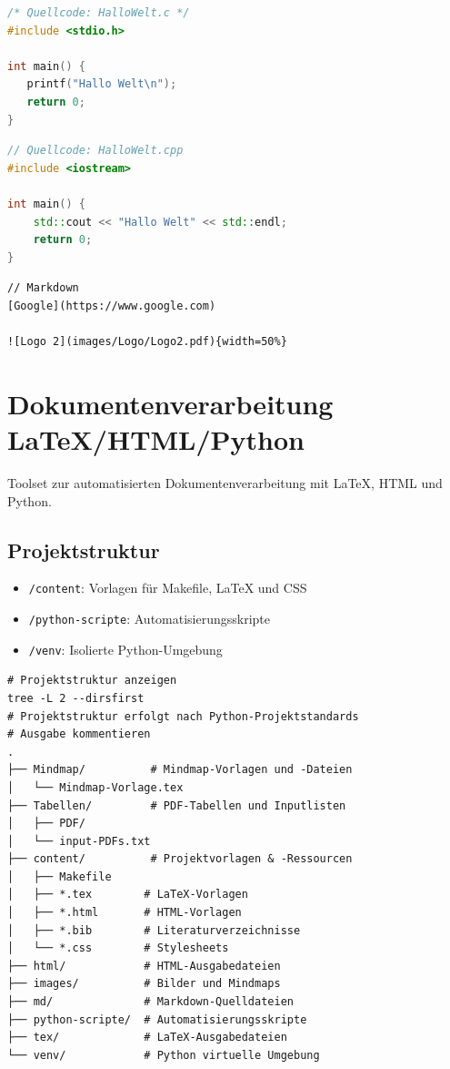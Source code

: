 \documentclass{vorlage-design-main}
\begin{document}
\begin{lstlisting}[language=C]
/* Quellcode: HalloWelt.c */
#include <stdio.h>

int main() {
   printf("Hallo Welt\n");
   return 0;
}
\end{lstlisting}

\begin{lstlisting}[language={C++}]
// Quellcode: HalloWelt.cpp
#include <iostream>

int main() {
    std::cout << "Hallo Welt" << std::endl;
    return 0;
}
\end{lstlisting}

\begin{lstlisting}
// Markdown
[Google](https://www.google.com)

![Logo 2](images/Logo/Logo2.pdf){width=50%}
\end{lstlisting}

\section{Dokumentenverarbeitung
LaTeX/HTML/Python}\label{dokumentenverarbeitung-latexhtmlpython}

Toolset zur automatisierten Dokumentenverarbeitung mit LaTeX, HTML und
Python.

\subsection{Projektstruktur}\label{projektstruktur}

\begin{itemize}

\item
  \verb|/content|: Vorlagen für Makefile, LaTeX und
  CSS
\item
  \verb|/python-scripte|: Automatisierungsskripte
\item
  \verb|/venv|: Isolierte Python-Umgebung
\end{itemize}

\begin{lstlisting}
# Projektstruktur anzeigen
tree -L 2 --dirsfirst
# Projektstruktur erfolgt nach Python-Projektstandards
# Ausgabe kommentieren
.
├── Mindmap/          # Mindmap-Vorlagen und -Dateien
│   └── Mindmap-Vorlage.tex
├── Tabellen/         # PDF-Tabellen und Inputlisten
│   ├── PDF/
│   └── input-PDFs.txt
├── content/          # Projektvorlagen & -Ressourcen
│   ├── Makefile
│   ├── *.tex        # LaTeX-Vorlagen
│   ├── *.html       # HTML-Vorlagen
│   ├── *.bib        # Literaturverzeichnisse
│   └── *.css        # Stylesheets
├── html/            # HTML-Ausgabedateien
├── images/          # Bilder und Mindmaps
├── md/              # Markdown-Quelldateien
├── python-scripte/  # Automatisierungsskripte
├── tex/             # LaTeX-Ausgabedateien
└── venv/            # Python virtuelle Umgebung
\end{lstlisting}
\end{document}
